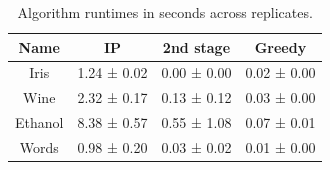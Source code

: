 \begin{table}[H]
\centering
\begin{tabular}{|c|c|c|c}
\toprule
Name & IP & 2nd stage & Greedy \\
\midrule
Iris & 1.24 ± 0.02 & 0.00 ± 0.00 & 0.02 ± 0.00 \\
Wine & 2.32 ± 0.17 & 0.13 ± 0.12 & 0.03 ± 0.00 \\
Ethanol & 8.38 ± 0.57 & 0.55 ± 1.08 & 0.07 ± 0.01 \\
Words & 0.98 ± 0.20 & 0.03 ± 0.02 & 0.01 ± 0.00 \\
\bottomrule
\end{tabular}
\caption{Algorithm runtimes in seconds across replicates.}
\end{table}